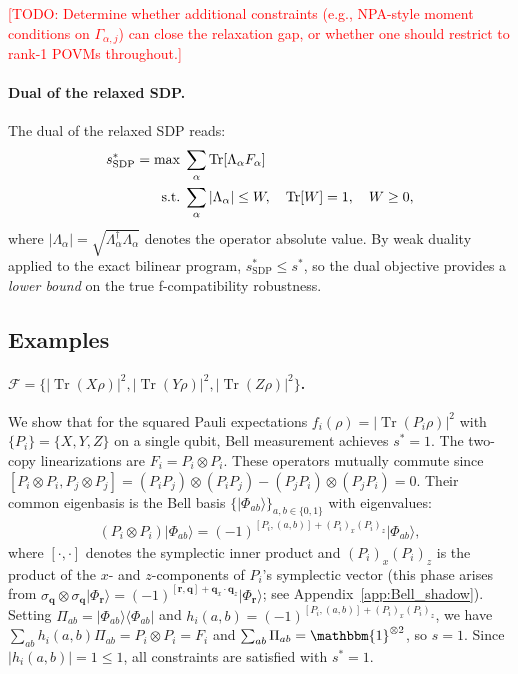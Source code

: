 \documentclass[aps,%
twocolumn,%
floatfix,%
pra,%
amsfonts,%
groupedaddress,%
superscriptaddress]{revtex4-2}%
\DeclareMathOperator{\tr}{Tr}
\newcommand{\ket}[1]{\lvert #1\rangle}
\newcommand{\proj}[1]{\lvert #1\rangle\!\langle #1\rvert}
\newcommand{\ox}{\otimes}
\newcommand{\1}{\mathbbm{1}}
\begin{document}
\textcolor{red}{[TODO: Determine whether additional constraints (e.g., NPA-style moment conditions on $\Gamma_{\alpha,j}$) can close the relaxation gap, or whether one should restrict to rank-1 POVMs throughout.]}
\color{black}

\paragraph{Dual of the relaxed SDP.}
The dual of the relaxed SDP reads:
\begin{align}
s^*_{\mathrm{SDP}} = \max\; & \sum_\alpha \tr[\Lambda_\alpha F_\alpha] \notag\\
\text{s.t.}\; & \sum_\alpha |\Lambda_\alpha| \leq W, \quad \tr[W] = 1, \quad W \geq 0, \label{eq:dual-SDP}
\end{align}
where $|\Lambda_\alpha| = \sqrt{\Lambda_\alpha^\dagger \Lambda_\alpha}$ denotes the operator absolute value. By weak duality applied to the exact bilinear program, $s^*_{\mathrm{SDP}} \leq s^*$, so the dual objective provides a \emph{lower bound} on the true f-compatibility robustness.

\subsection{Examples}
\paragraph{$\mathcal{F} = \{|\tr(X\rho)|^2, |\tr(Y\rho)|^2, |\tr(Z\rho)|^2\}$.}
We show that for the squared Pauli expectations $f_i(\rho) = |\tr(P_i\rho)|^2$ with $\{P_i\} = \{X,Y,Z\}$ on a single qubit, Bell measurement achieves $s^* = 1$.
The two-copy linearizations are $F_i = P_i \ox P_i$. These operators mutually commute since $[P_i\ox P_i, P_j\ox P_j] = (P_iP_j)\ox(P_iP_j) - (P_jP_i)\ox(P_jP_i) = 0$. Their common eigenbasis is the Bell basis $\{\ket{\Phi_{ab}}\}_{a,b\in\{0,1\}}$ with eigenvalues:
\begin{align}
(P_i \ox P_i)\ket{\Phi_{ab}} = (-1)^{[P_i, (a,b)] + (P_i)_x(P_i)_z}\ket{\Phi_{ab}},\label{eq:bell_eigenvalue}
\end{align}
where $[\cdot,\cdot]$ denotes the symplectic inner product and $(P_i)_x(P_i)_z$ is the product of the $x$- and $z$-components of $P_i$'s symplectic vector (this phase arises from $\sigma_\mathbf{q}\ox\sigma_\mathbf{q}\ket{\Phi_\mathbf{r}} = (-1)^{[\mathbf{r},\mathbf{q}]+\mathbf{q}_x\cdot\mathbf{q}_z}\ket{\Phi_\mathbf{r}}$; see Appendix~\ref{app:Bell_shadow}). Setting $\Pi_{ab} = \proj{\Phi_{ab}}$ and $h_i(a,b) = (-1)^{[P_i,(a,b)] + (P_i)_x(P_i)_z}$, we have $\sum_{ab} h_i(a,b)\Pi_{ab} = P_i \ox P_i = F_i$ and $\sum_{ab}\Pi_{ab} = \1^{\ox 2}$, so $s = 1$. Since $|h_i(a,b)| = 1 \leq 1$, all constraints are satisfied with $s^* = 1$.
\end{document}
